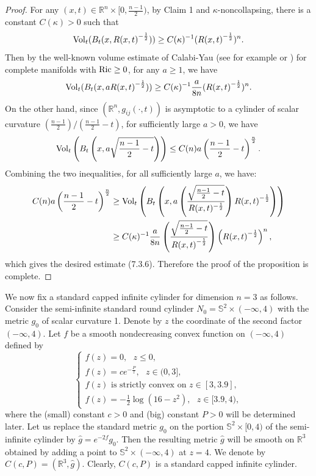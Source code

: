 \begin{proof}
For any $(x,t)\in \mathbb{R}^{n}\times[0,\frac{n-1}{2})$, by Claim
1 and $\kappa$-noncollapsing, there is a constant $C(\kappa)>0$
such that
$$
\operatorname{Vol}_{t}(B_{t}(x,{R(x,t)}^{-\frac{1}{2}}))\geq
C(\kappa)^{-1}({R(x,t)}^{-\frac{1}{2}})^{n}.
$$
Then by the well-known volume estimate of Calabi-Yau (see for
example \cite{Y76} or \cite{ScY}) for complete manifolds with
$\operatorname{Ric}\geq 0$, for any $a\geq 1$, we have
$$
\operatorname{Vol}_{t}(B_{t}(x,a{R(x,t)}^{-\frac{1}{2}}))\geq
C(\kappa)^{-1}\frac{a}{8n}({R(x,t)}^{-\frac{1}{2}})^{n}.
$$
On the other hand, since $(\mathbb{R}^{n},g_{ij}(\cdot,t))$ is
asymptotic to a cylinder of scalar curvature
${(\frac{n-1}{2})}/{(\frac{n-1}{2}-t)}$, for sufficiently large
$a>0$, we have
$$
\operatorname{Vol}_{t}\left(B_{t}\left(x,a\sqrt{\frac{n-1}{2}-t}\right)\right)\leq
C(n)a\left(\frac{n-1}{2}-t\right)^{\frac{n}{2}}.
$$
Combining the two inequalities, for  all sufficiently large $a$,
we have:
\begin{align*}
C(n)a\left(\frac{n-1}{2}-t\right)^{\frac{n}{2}}&  \geq
\operatorname{Vol}_{t}\left(B_{t}\left(x,a\left(\frac{\sqrt{\frac{n-1}{2}
-t}}{R(x,t)^{-\frac{1}{2}}}\right){R(x,t)}^{-\frac{1}{2}}\right)\right)\\
&  \geq C(\kappa)^{-1}\frac{a}{8n}\left(\frac{\sqrt{\frac{n-1}{2}
-t}}{{R(x,t)}^{-\frac{1}{2}}}\right) \left({R(x,t)}^{-\frac{1}{2}}\right)^{n},
\end{align*}
which gives the desired estimate (7.3.6). Therefore the proof of
the proposition is complete.
\end{proof}

We now fix a standard capped infinite cylinder for dimension $n=3$
as follows.  Consider the semi-infinite standard round cylinder
$N_0 = \mathbb{S}^2 \times (-\infty,4)$ with the metric $g_0$ of
scalar curvature 1. Denote by $z$ the coordinate of the second
factor $(-\infty,4)$. Let $f$ be a smooth nondecreasing convex
function on $(-\infty,4)$ defined by \begin{equation}
   \left\{
   \begin{array}{lll}
    f(z) = 0, \ \ \ z\leq 0,
         \\[3mm]
    f(z) = ce^{-\frac{P}{z}}, \ \ \ z \in (0,3], \\[3mm]
    f(z) \mbox{ is strictly convex on } z \in [3,3.9], \\[3mm]
    f(z) = -\frac{1}{2}\log(16-z^2), \ \ \ z \in [3.9,4),
\end{array}
\right.         %
\end{equation} where the (small) constant $c>0$ and (big) constant $P>0$ will
be determined later. Let us replace the standard metric $g_0$ on
the portion $\mathbb{S}^2 \times [0,4)$ of the semi-infinite
cylinder by $\hat{g} = e^{-2f}g_0$. Then the resulting metric
$\hat{g}$ will be smooth on $\mathbb{R}^3$ obtained by adding a
point to $\mathbb{S}^2 \times (-\infty,4)$ at $z=4$. We denote by
$C(c,P) = (\mathbb{R}^3,\hat{g})$. Clearly, $C(c,P)$ is a standard
capped infinite cylinder.

